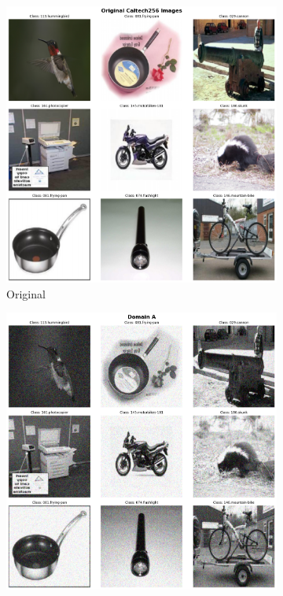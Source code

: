 \begin{figure}[ht]
      \centering
      \begin{subfigure}[b]{0.4\textwidth}
            \centering
            \includegraphics[width=\textwidth]{figures/domain_shift_1.png}
            \caption{Original}
      \end{subfigure}
      \hfill
      \begin{subfigure}[b]{0.4\textwidth}
            \centering
            \includegraphics[width=\textwidth]{figures/domain_shift_2.png}

\end{subfigure}
\end{figure}
